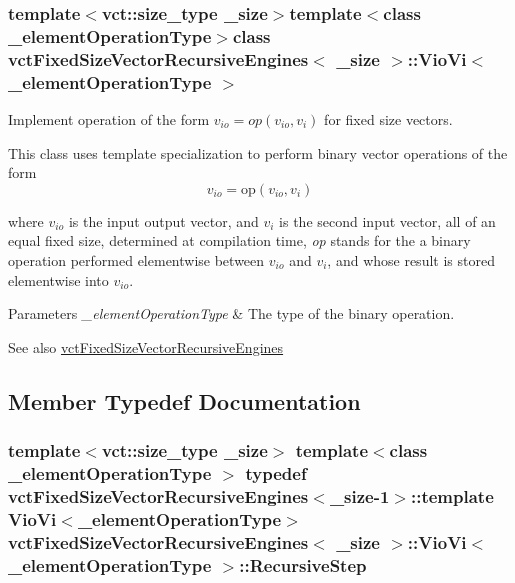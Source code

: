 \subsubsection*{template$<$vct\+::size\+\_\+type \+\_\+size$>$template$<$class \+\_\+element\+Operation\+Type$>$class vct\+Fixed\+Size\+Vector\+Recursive\+Engines$<$ \+\_\+size $>$\+::\+Vio\+Vi$<$ \+\_\+element\+Operation\+Type $>$}

Implement operation of the form $v_{io} = op(v_{io}, v_i)$ for fixed size vectors. 

This class uses template specialization to perform binary vector operations of the form \[ v_{io} = \mathrm{op}(v_{io}, v_{i}) \]

where $v_{io}$ is the input output vector, and $v_{i}$ is the second input vector, all of an equal fixed size, determined at compilation time, {\itshape op} stands for the a binary operation performed elementwise between $v_{io}$ and $v_{i}$, and whose result is stored elementwise into $v_{io}$.


\begin{DoxyParams}{Parameters}
{\em \+\_\+element\+Operation\+Type} & The type of the binary operation.\\
\hline
\end{DoxyParams}
\begin{DoxySeeAlso}{See also}
\hyperlink{classvct_fixed_size_vector_recursive_engines}{vct\+Fixed\+Size\+Vector\+Recursive\+Engines} 
\end{DoxySeeAlso}


\subsection{Member Typedef Documentation}
\hypertarget{classvct_fixed_size_vector_recursive_engines_1_1_vio_vi_a1b0e842f1ca3b4e60a18b11e85382449}{}
\subsubsection[{Recursive\+Step}]{\setlength{\rightskip}{0pt plus 5cm}template$<$vct\+::size\+\_\+type \+\_\+size$>$ template$<$class \+\_\+element\+Operation\+Type $>$ typedef {\bf vct\+Fixed\+Size\+Vector\+Recursive\+Engines}$<$\+\_\+size-\/1$>$\+::template {\bf Vio\+Vi}$<$\+\_\+element\+Operation\+Type$>$ {\bf vct\+Fixed\+Size\+Vector\+Recursive\+Engines}$<$ \+\_\+size $>$\+::{\bf Vio\+Vi}$<$ \+\_\+element\+Operation\+Type $>$\+::{\bf Recursive\+Step}}\label{classvct_fixed_size_vector_recursive_engines_1_1_vio_vi_a1b0e842f1ca3b4e60a18b11e85382449}


